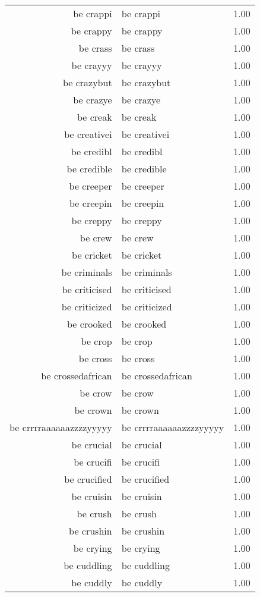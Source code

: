 \begin{table}[ht]
\begin{tabular}{rlr}
  be crappi & be crappi & 1.00 \\ 
  be crappy & be crappy & 1.00 \\ 
  be crass & be crass & 1.00 \\ 
  be crayyy & be crayyy & 1.00 \\ 
  be crazybut & be crazybut & 1.00 \\ 
  be crazye & be crazye & 1.00 \\ 
  be creak & be creak & 1.00 \\ 
  be creativei & be creativei & 1.00 \\ 
  be credibl & be credibl & 1.00 \\ 
  be credible & be credible & 1.00 \\ 
  be creeper & be creeper & 1.00 \\ 
  be creepin & be creepin & 1.00 \\ 
  be creppy & be creppy & 1.00 \\ 
  be crew & be crew & 1.00 \\ 
  be cricket & be cricket & 1.00 \\ 
  be criminals & be criminals & 1.00 \\ 
  be criticised & be criticised & 1.00 \\ 
  be criticized & be criticized & 1.00 \\ 
  be crooked & be crooked & 1.00 \\ 
  be crop & be crop & 1.00 \\ 
  be cross & be cross & 1.00 \\ 
  be crossedafrican & be crossedafrican & 1.00 \\ 
  be crow & be crow & 1.00 \\ 
  be crown & be crown & 1.00 \\ 
  be crrrraaaaaazzzzyyyyy & be crrrraaaaaazzzzyyyyy & 1.00 \\ 
  be crucial & be crucial & 1.00 \\ 
  be crucifi & be crucifi & 1.00 \\ 
  be crucified & be crucified & 1.00 \\ 
  be cruisin & be cruisin & 1.00 \\ 
  be crush & be crush & 1.00 \\ 
  be crushin & be crushin & 1.00 \\ 
  be crying & be crying & 1.00 \\ 
  be cuddling & be cuddling & 1.00 \\ 
  be cuddly & be cuddly & 1.00 \\ 

\end{tabular}
\end{table}
